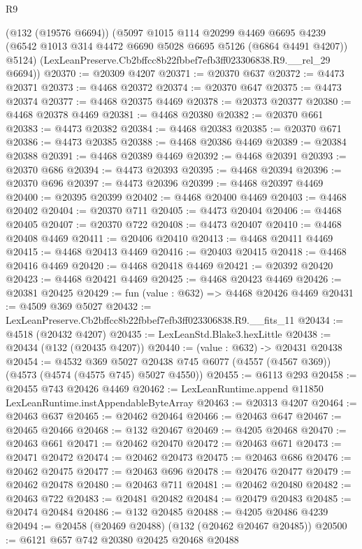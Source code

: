 \begin{lexlean}{R9}
\begin{coremodule}
      (@132 (@19576 @6694))
      (@5097
        @1015
        @114
        @20299
        @4469
        @6695
        @4239
        (@6542 @1013 @314 @4472 @6690 @5028 @6695 @5126 (@6864 @4491 @4207))
        @5124)
      (LexLeanPreserve.Cb2bffcc8b22fbbef7efb3ff023306838.R9.__rel_29 @6694))
@20370 := @20309 @4207
@20371 := @20370 @637
@20372 := @4473 @20371
@20373 := @4468 @20372
@20374 := @20370 @647
@20375 := @4473 @20374
@20377 := @4468 @20375 @4469
@20378 := @20373 @20377
@20380 := @4468 @20378 @4469
@20381 := @4468 @20380
@20382 := @20370 @661
@20383 := @4473 @20382
@20384 := @4468 @20383
@20385 := @20370 @671
@20386 := @4473 @20385
@20388 := @4468 @20386 @4469
@20389 := @20384 @20388
@20391 := @4468 @20389 @4469
@20392 := @4468 @20391
@20393 := @20370 @686
@20394 := @4473 @20393
@20395 := @4468 @20394
@20396 := @20370 @696
@20397 := @4473 @20396
@20399 := @4468 @20397 @4469
@20400 := @20395 @20399
@20402 := @4468 @20400 @4469
@20403 := @4468 @20402
@20404 := @20370 @711
@20405 := @4473 @20404
@20406 := @4468 @20405
@20407 := @20370 @722
@20408 := @4473 @20407
@20410 := @4468 @20408 @4469
@20411 := @20406 @20410
@20413 := @4468 @20411 @4469
@20415 := @4468 @20413 @4469
@20416 := @20403 @20415
@20418 := @4468 @20416 @4469
@20420 := @4468 @20418 @4469
@20421 := @20392 @20420
@20423 := @4468 @20421 @4469
@20425 := @4468 @20423 @4469
@20426 := @20381 @20425
@20429 := fun (value : @632) => @4468 @20426 @4469
@20431 := @4509 @369 @5027
@20432 := LexLeanPreserve.Cb2bffcc8b22fbbef7efb3ff023306838.R9.__fits_11
@20434 := @4518 (@20432 @4207)
@20435 := LexLeanStd.Blake3.hexLittle
@20438 := @20434 (@132 (@20435 @4207))
@20440 := (value : @632) -> @20431 @20438
@20454 := @4532
    @369
    @5027
    @20438
    @745
    @6077
    (@4557 (@4567 @369))
    (@4573 (@4574 (@4575 @745) @5027 @4550))
@20455 := @6113 @293
@20458 := @20455 @743 @20426 @4469
@20462 := LexLeanRuntime.append @11850 LexLeanRuntime.instAppendableByteArray
@20463 := @20313 @4207
@20464 := @20463 @637
@20465 := @20462 @20464
@20466 := @20463 @647
@20467 := @20465 @20466
@20468 := @132 @20467
@20469 := @4205 @20468
@20470 := @20463 @661
@20471 := @20462 @20470
@20472 := @20463 @671
@20473 := @20471 @20472
@20474 := @20462 @20473
@20475 := @20463 @686
@20476 := @20462 @20475
@20477 := @20463 @696
@20478 := @20476 @20477
@20479 := @20462 @20478
@20480 := @20463 @711
@20481 := @20462 @20480
@20482 := @20463 @722
@20483 := @20481 @20482
@20484 := @20479 @20483
@20485 := @20474 @20484
@20486 := @132 @20485
@20488 := @4205 @20486 @4239
@20494 := @20458 (@20469 @20488) (@132 (@20462 @20467 @20485))
@20500 := @6121 @657 @742 @20380 @20425 @20468 @20488

\end{coremodule}
\end{lexlean}
